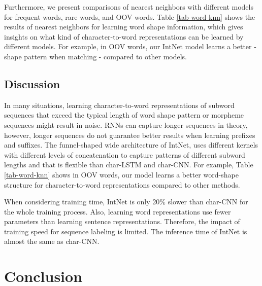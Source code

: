 \documentclass[11pt,a4paper]{article}
\begin{document}
Furthermore, we present comparisons of nearest neighbors with different models for frequent words, rare words, and OOV words. Table \ref{tab-word-knn} shows the results of nearest neighbors for learning word shape information, which gives insights on what kind of character-to-word representations can be learned by different models. For example, in OOV words, our IntNet model learns a better - shape pattern when matching - compared to other models.

\subsection{Discussion}

In many situations, learning character-to-word representations of subword sequences that exceed the typical length of word shape pattern or morpheme sequences might result in noise. RNNs can capture longer sequences in theory, however, longer sequences do not guarantee better results when learning prefixes and suffixes. The funnel-shaped wide architecture of IntNet, uses different kernels with different levels of concatenation to capture patterns of different subword lengths and that is flexible than char-LSTM and char-CNN. For example, Table \ref{tab-word-knn} shows  in OOV words, our model learns a better word-shape structure for character-to-word representations compared to other methods.

When considering training time, IntNet is only 20\% slower than char-CNN for the whole training process. Also, learning word representations use fewer parameters than learning sentence representations. Therefore, the impact of training speed for sequence labeling is limited. The inference time of IntNet is almost the same as char-CNN.
 
\section{Conclusion}
\end{document}
